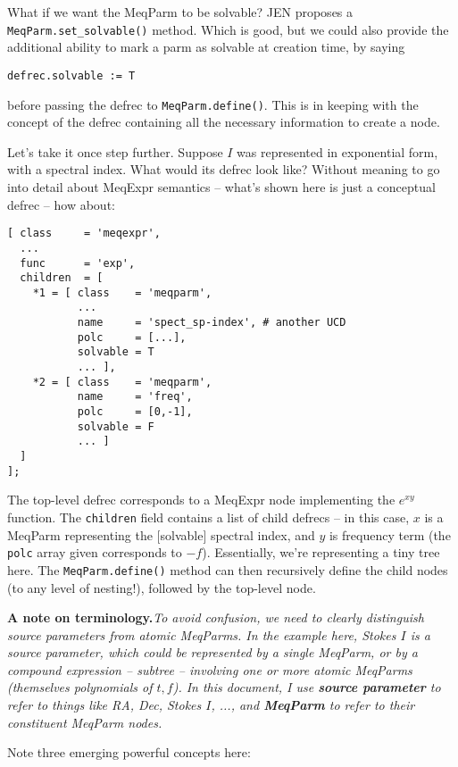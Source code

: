 \documentclass[10pt]{article}
\begin{document}
What if we want the MeqParm to be solvable? JEN \cite{PSS4} proposes a {\tt
MeqParm.set\_solvable()} method. Which is good, but we could also provide the
additional ability to mark a parm as solvable at creation time, by saying

\begin{verbatim}
defrec.solvable := T
\end{verbatim}

before passing the defrec to {\tt MeqParm.define()}. This is in keeping with
the concept of the defrec containing all the necessary information to create a
node.

Let's take it once step further. Suppose $I$ was represented in exponential
form, with a spectral index. What would its defrec look like? Without meaning
to go into detail about MeqExpr semantics -- what's shown here is just a
conceptual defrec -- how about:

\begin{verbatim}
[ class     = 'meqexpr',
  ...
  func      = 'exp',
  children  = [ 
    *1 = [ class    = 'meqparm',
           ...
           name     = 'spect_sp-index', # another UCD
           polc     = [...],
           solvable = T
           ... ],
    *2 = [ class    = 'meqparm',
           name     = 'freq',           
           polc     = [0,-1],
           solvable = F
           ... ] 
  ]
];
\end{verbatim}

The top-level defrec corresponds to a MeqExpr node implementing the $e^{xy}$
function. The {\tt children} field contains a list of child defrecs -- in this
case, $x$ is a MeqParm representing the [solvable] spectral index, and $y$ is
frequency term (the {\tt polc} array given corresponds to $-f$). Essentially,
we're representing a tiny tree here. The {\tt MeqParm.define()} method can then
recursively define the child nodes (to any level of nesting!), followed by the
top-level node.

{\bf A note on terminology.}{\em To avoid confusion, we need to clearly 
distinguish source parameters from atomic MeqParms. In the example here, Stokes
$I$ is a source parameter, which could be represented by a single MeqParm, or
by a compound expression -- subtree -- involving one or more atomic MeqParms
(themselves polynomials of $t,f$). In this document, I use {\bf source
parameter} to refer to things like RA, Dec, Stokes $I$, ..., and {\bf MeqParm} to
refer to their constituent MeqParm nodes.}

Note three emerging powerful concepts here:
\end{document}
